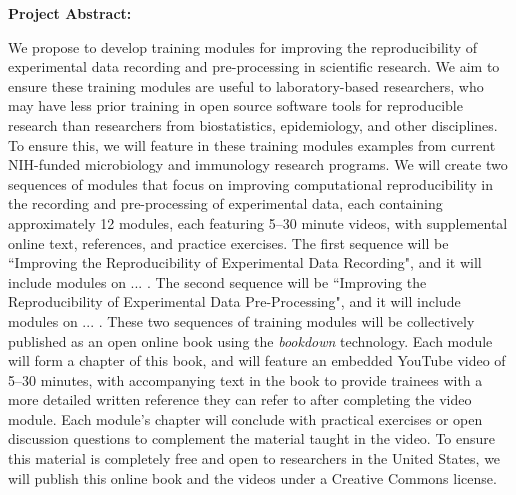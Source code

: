 \documentclass[pdftex,english,11pt,parskip=half]{scrartcl}
\begin{document}
\def\bf{\normalfont\bfseries}
\pagestyle{empty}

{\large \textbf{Project Abstract:}}


We propose to develop training modules for improving the reproducibility of experimental data recording and pre-processing in scientific research. We aim to ensure these training modules are useful to laboratory-based researchers, who may have less prior training in open source software tools for reproducible research than researchers from biostatistics, epidemiology, and other disciplines. To ensure this, we will feature in these training modules examples from current 
NIH-funded microbiology and immunology research programs. We will create two sequences of modules that focus on improving computational reproducibility in the recording and pre-processing of experimental data, each containing approximately 12 modules, each featuring 5--30 minute videos, with supplemental online text, references, and practice exercises. The first sequence will be ``Improving the Reproducibility of Experimental Data Recording", and it will include modules on ... . The second sequence will be ``Improving the Reproducibility of Experimental Data Pre-Processing", and it will include modules on ... . These two sequences of training modules will be collectively published as an open online book using the \textit{bookdown} technology. Each module will form a chapter of this book, and will feature an embedded YouTube video of 5--30 minutes, with accompanying text in the book to provide trainees with a more detailed written reference they can refer to after completing the video module. Each module's chapter will conclude with practical exercises or open discussion questions to complement the material taught in the video. To ensure this material is completely free and open to researchers in the United States, we will publish this online book and the videos under a Creative Commons license.
\end{document}
